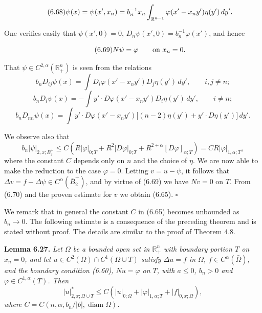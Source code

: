 \begin{equation}
\tag{6.68}
\psi(x)=\psi(x',x_n)=b_n^{-1}x_n \int_{\mathbb{R}^{n-1}} \varphi(x'-x_n y')\eta(y')\,dy'.
\end{equation}

\noindent One verifies easily that $\psi(x',0)=0$, $D_n\psi(x',0)=b_n^{-1}\varphi(x')$, and hence

\begin{equation}
\tag{6.69}
N\psi=\varphi \qquad \text{on } x_n=0.
\end{equation}



\providecommand{\R}{\mathbb{R}}
\providecommand{\T}{T}
\providecommand{\B}{B}
\providecommand{\cC}{C}
\providecommand{\cN}{N}
\providecommand{\cL}{L}

That $\psi \in C^{2,\alpha}(\R_+^n)$ is seen from the relations
\[
b_n D_{ij}\psi(x)=\int D_i\varphi(x'-x_n y')D_j\eta(y')\,dy',
 \qquad i,j\neq n;
\]
\[
b_n D_i\psi(x)=-\int y'\cdot D\varphi(x'-x_n y')D_i\eta(y')\,dy',
 \qquad i\neq n;
\]
\[
b_n D_{nn}\psi(x)=\int y'\cdot D\varphi(x'-x_n y')\big[(n-2)\eta(y')+y'\cdot D\eta(y')\big]\,dy'.
\]

We observe also that
\begin{equation}\tag{6.70}
b_n|\psi|_{2,x;B_2^+}\le C(R|\varphi|_{0;T}+R^2|D\varphi|_{0;T}+R^{2+\alpha}[D\varphi]_{\alpha;T})
=CR|\varphi|_{1,\alpha;T},
\end{equation}
where the constant $C$ depends only on $n$ and the choice of $\eta$.
We are now able to make the reduction to the case $\varphi=0$. Letting $v=u-\psi$,
it follows that $\Delta v=f-\Delta\psi\in C^\alpha(\bar B_2^+)$, and by virtue of (6.69) we have $Nv=0$ on
$T$. From (6.70) and the proven estimate for $v$ we obtain (6.65). $\square$

We remark that in general the constant $C$ in (6.65) becomes unbounded as
$b_n\to 0$.
The following estimate is a consequence of the preceding theorem and is stated
without proof. The details are similar to the proof of Theorem 4.8.

\textbf{Lemma 6.27.} \textit{Let $\Omega$ be a bounded open set in $\R_+^n$ with boundary portion $T$ on
$x_n=0$, and let $u\in C^2(\Omega)\cap C^1(\Omega\cup T)$ satisfy $\Delta u=f$ in $\Omega$, $f\in C^\alpha(\bar\Omega)$, and the
boundary condition (6.60), $Nu=\varphi$ on $T$, with $a\le 0$, $b_n>0$ and $\varphi\in C^{1,\alpha}(T)$. Then}
\[
|u|_{2,x;\Omega\cup T}^*\le C(|u|_{0;\Omega}+|\varphi|_{1,\alpha;T}+|f|_{0,x;\Omega}),
\]
\textit{where $C=C(n,\alpha,b_n/|b|,\operatorname{diam}\Omega)$.}

